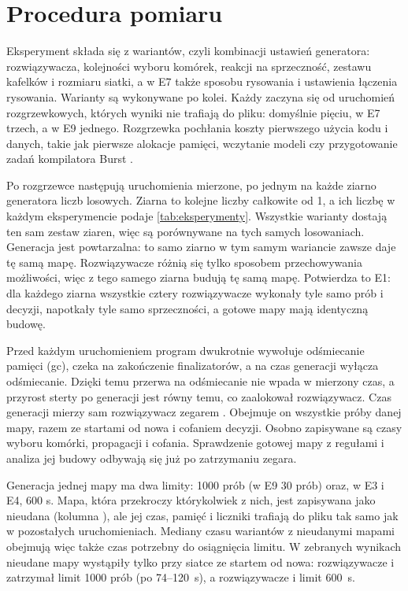 \section{Procedura pomiaru}
\label{sec:procedura}

Eksperyment składa się z wariantów, czyli kombinacji ustawień generatora: rozwiązywacza, kolejności wyboru komórek, reakcji na sprzeczność, zestawu kafelków i rozmiaru siatki, a w E7 także sposobu rysowania i ustawienia łączenia rysowania. Warianty są wykonywane po kolei. Każdy zaczyna się od uruchomień rozgrzewkowych, których wyniki nie trafiają do pliku: domyślnie pięciu, w E7 trzech, a w E9 jednego. Rozgrzewka pochłania koszty pierwszego użycia kodu i danych, takie jak pierwsze alokacje pamięci, wczytanie modeli czy przygotowanie zadań kompilatora Burst \cite{UnityBurst}.

Po rozgrzewce następują uruchomienia mierzone, po jednym na każde ziarno generatora liczb losowych. Ziarna to kolejne liczby całkowite od 1, a ich liczbę w każdym eksperymencie podaje \cref{tab:eksperymenty}. Wszystkie warianty dostają ten sam zestaw ziaren, więc są porównywane na tych samych losowaniach. Generacja jest powtarzalna: to samo ziarno w tym samym wariancie zawsze daje tę samą mapę. Rozwiązywacze różnią się tylko sposobem przechowywania możliwości, więc z tego samego ziarna budują tę samą mapę. Potwierdza to E1: dla każdego ziarna wszystkie cztery rozwiązywacze wykonały tyle samo prób i decyzji, napotkały tyle samo sprzeczności, a gotowe mapy mają identyczną budowę.

Przed każdym uruchomieniem program dwukrotnie wywołuje odśmiecanie pamięci (\ac{gc}), czeka na zakończenie finalizatorów, a na czas generacji wyłącza odśmiecanie. Dzięki temu przerwa na odśmiecanie nie wpada w mierzony czas, a przyrost sterty po generacji jest równy temu, co zaalokował rozwiązywacz. Czas generacji mierzy sam rozwiązywacz zegarem . Obejmuje on wszystkie próby danej mapy, razem ze startami od nowa i cofaniem decyzji. Osobno zapisywane są czasy wyboru komórki, propagacji i cofania. Sprawdzenie gotowej mapy z regułami i analiza jej budowy odbywają się już po zatrzymaniu zegara.

Generacja jednej mapy ma dwa limity: 1000 prób (w E9 30 prób) oraz, w E3 i E4, 600 s. Mapa, która przekroczy którykolwiek z nich, jest zapisywana jako nieudana (kolumna ), ale jej czas, pamięć i liczniki trafiają do pliku tak samo jak w pozostałych uruchomieniach. Mediany czasu wariantów z nieudanymi mapami obejmują więc także czas potrzebny do osiągnięcia limitu. W zebranych wynikach nieudane mapy wystąpiły tylko przy siatce  ze startem od nowa: rozwiązywacze  i  zatrzymał limit 1000 prób (po 74--120~s), a rozwiązywacze  i  limit 600~s.

